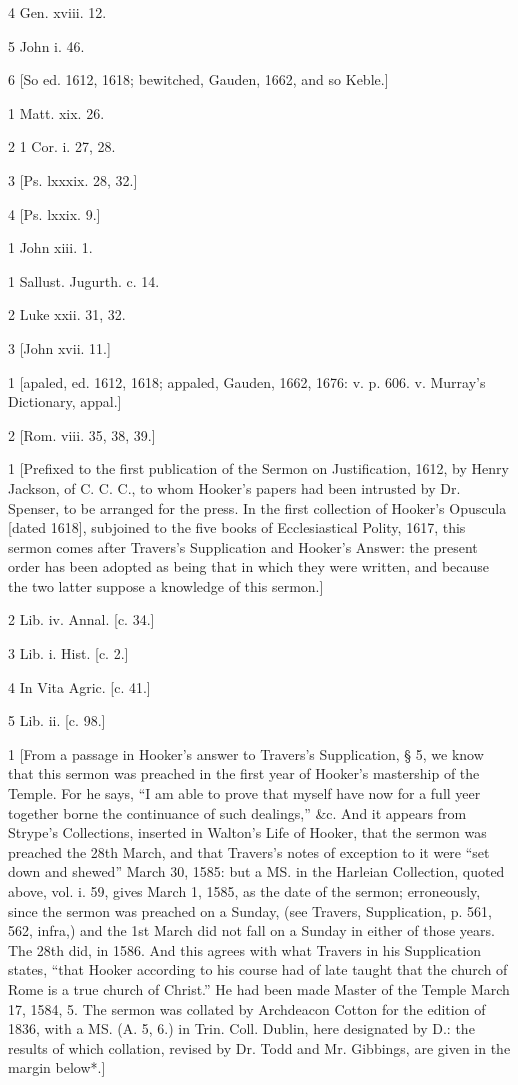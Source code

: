 4
Gen. xviii. 12.

5
John i. 46.

6
[So ed. 1612, 1618; bewitched, Gauden, 1662, and so Keble.]

1
Matt. xix. 26.

2
1 Cor. i. 27, 28.

3
[Ps. lxxxix. 28, 32.]

4
[Ps. lxxix. 9.]

1
John xiii. 1.

1
Sallust. Jugurth. c. 14.

2
Luke xxii. 31, 32.

3
[John xvii. 11.]

1
[apaled, ed. 1612, 1618; appaled, Gauden, 1662, 1676: v. p. 606. v. Murray’s Dictionary, appal.]

2
[Rom. viii. 35, 38, 39.]

1
[Prefixed to the first publication of the Sermon on Justification, 1612, by Henry Jackson, of C. C. C., to whom Hooker’s papers had been intrusted by Dr. Spenser, to be arranged for the press. In the first collection of Hooker’s Opuscula [dated 1618], subjoined to the five books of Ecclesiastical Polity, 1617, this sermon comes after Travers’s Supplication and Hooker’s Answer: the present order has been adopted as being that in which they were written, and because the two latter suppose a knowledge of this sermon.]

2
Lib. iv. Annal. [c. 34.]

3
Lib. i. Hist. [c. 2.]

4
In Vita Agric. [c. 41.]

5
Lib. ii. [c. 98.]

1
[From a passage in Hooker’s answer to Travers’s Supplication, § 5, we know that this sermon was preached in the first year of Hooker’s mastership of the Temple. For he says, “I am able to prove that myself have now for a full yeer together borne the continuance of such dealings,” &c. And it appears from Strype’s Collections, inserted in Walton’s Life of Hooker, that the sermon was preached the 28th March, and that Travers’s notes of exception to it were “set down and shewed” March 30, 1585: but a MS. in the Harleian Collection, quoted above, vol. i. 59, gives March 1, 1585, as the date of the sermon; erroneously, since the sermon was preached on a Sunday, (see Travers, Supplication, p. 561, 562, infra,) and the 1st March did not fall on a Sunday in either of those years. The 28th did, in 1586. And this agrees with what Travers in his Supplication states, “that Hooker according to his course had of late taught that the church of Rome is a true church of Christ.” He had been made Master of the Temple March 17, 1584, 5. The sermon was collated by Archdeacon Cotton for the edition of 1836, with a MS. (A. 5, 6.) in Trin. Coll. Dublin, here designated by D.: the results of which collation, revised by Dr. Todd and Mr. Gibbings, are given in the margin below*.]

